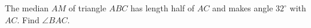 The median $AM$ of triangle $ABC$ has length half of $AC$ and makes angle $32^\circ$ with $AC$. Find $\angle BAC$.

